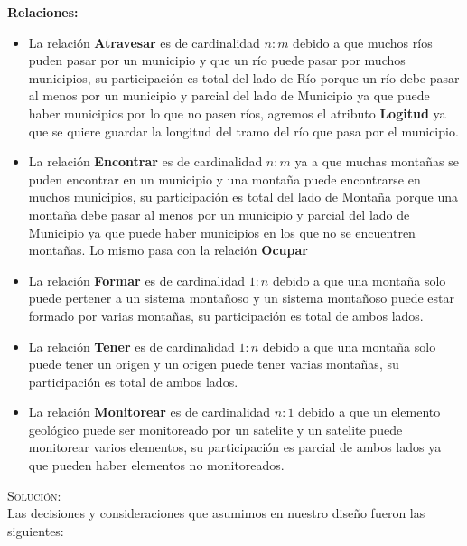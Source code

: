 \documentclass[letterpaper,11pt]{article}
\begin{document}
\begin{itemize}
\begin{itemize}
      \textbf{Relaciones: }
      \begin{itemize}
      \item La relación \textbf{Atravesar} es de cardinalidad $n:m$ debido
            a que muchos ríos puden pasar por un municipio y que un río puede
            pasar por muchos municipios, su participación es total del lado de
            Río porque un río debe pasar al menos por un municipio y parcial del
            lado de Municipio ya que puede haber municipios por lo que no pasen ríos,
            agremos el atributo \textbf{Logitud} ya que se quiere guardar la longitud
            del tramo del río que pasa por el municipio.
      \item La relación \textbf{Encontrar} es de cardinalidad $n:m$ ya
            a que muchas montañas se puden encontrar en un municipio y una montaña puede
            encontrarse en muchos municipios, su participación es total del lado de
           Montaña porque una montaña debe pasar al menos por un municipio y parcial del
           lado de Municipio ya que puede haber municipios en los que no se encuentren
           montañas. Lo mismo pasa con la relación \textbf{Ocupar}

      \item La relación \textbf{Formar} es de cardinalidad $1:n$ debido a que una montaña
            solo puede pertener a un sistema montañoso y un sistema montañoso puede estar
            formado por varias montañas, su participación es total de ambos lados.

      \item La relación \textbf{Tener} es de cardinalidad $1:n$ debido a que una montaña
            solo puede tener un origen y un origen puede tener varias montañas, su
            participación es total de ambos lados.

      \item La relación \textbf{Monitorear} es de cardinalidad $n:1$ debido a que un
            elemento geológico puede ser monitoreado por un satelite y un satelite puede
            monitorear varios elementos, su participación es parcial de ambos lados ya que
            pueden haber elementos no monitoreados.
      \end{itemize}



    \end{itemize}

 \textsc{Solución:}\\
 Las decisiones y consideraciones que asumimos en nuestro diseño fueron 
las siguientes: 


\end{itemize}
\end{document}
